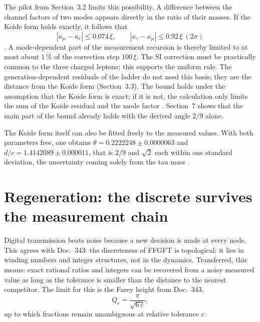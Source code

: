 The pilot from Section~3.2 limits this possibility. A difference between the channel factors of two
modes appears directly in the ratio of their masses. If the Koide form holds exactly, it follows that
\begin{equation}
  |\kappa_\mu-\kappa_e|\le0.074\,\xi,\qquad |\kappa_\tau-\kappa_\mu|\le0.92\,\xi\ (2\sigma)
\end{equation}
\KM. A mode-dependent part of the measurement recursion is thereby limited to at most about $1\,\%$ of
the correction step $100\,\xi$. The SI correction must be practically common to the three charged
leptons; this supports the uniform rule. The generation-dependent residuals of the ladder do not need
this basis; they are the distance from the Koide form (Section~3.3). The bound holds under the
assumption that the Koide form is exact; if it is not, the calculation only limits the sum of the
Koide residual and the mode factor \SM. Section~7 shows that the main part of the bound already holds
with the derived angle $2/9$ alone.

The Koide form itself can also be fitted freely to the measured values. With both parameters free,
one obtains $\theta=0.2222248\pm0.0000063$ and $d/c=1.4142089\pm0.000011$, that is $2/9$ and $\sqrt2$
each within one standard deviation, the uncertainty coming solely from the tau mass \KM.

\section{Regeneration: the discrete survives the measurement chain}

Digital transmission beats noise because a new decision is made at every node. This agrees with
Doc.~343: the discreteness of FFGFT is topological; it lies in winding numbers and integer structures,
not in the dynamics. Transferred, this means: exact rational ratios and integers can be recovered from
a noisy measured value as long as the tolerance is smaller than the distance to the nearest competitor.
The limit for this is the Farey height from Doc.~343,
\begin{equation}
  Q_c=\frac{\pi}{\sqrt{6\,\varepsilon}} ,
\end{equation}
up to which fractions remain unambiguous at relative tolerance $\varepsilon$:


